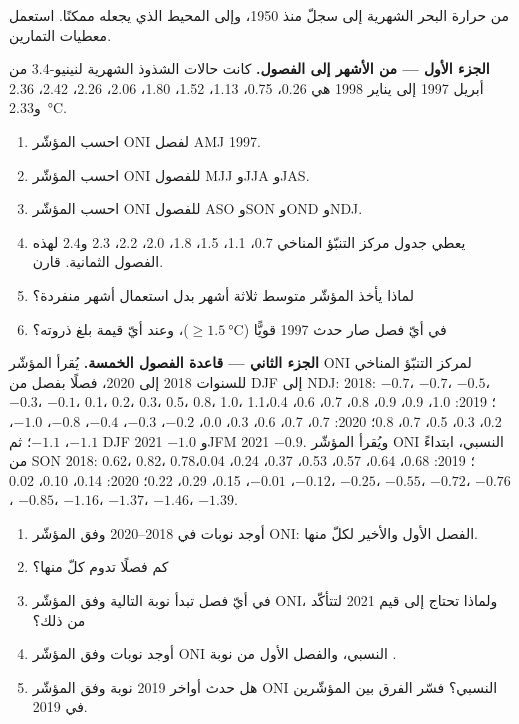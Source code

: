 \begin{problem}\label{pb:b2:climate-variability:1}
من حرارة البحر الشهرية إلى سجلّ  منذ 1950، وإلى المحيط الذي يجعله
ممكنًا. استعمل معطيات التمارين.

\medskip\noindent\textbf{الجزء الأول --- من الأشهر إلى الفصول.}
كانت حالات الشذوذ الشهرية لنينيو-3.4 من أبريل 1997 إلى يناير 1998 هي 0.26، 0.75، 1.13، 1.52، 1.80،
2.06، 2.26، 2.42، 2.36 و\qty{2.33}{\celsius}.
\begin{enumerate}
  \item احسب المؤشّر ONI لفصل AMJ 1997.
  \item احسب المؤشّر ONI للفصول MJJ وJJA وJAS.
  \item احسب المؤشّر ONI للفصول ASO وSON وOND وNDJ.
  \item يعطي جدول مركز التنبّؤ المناخي 0.7، 1.1، 1.5، 1.8، 2.0، 2.2، 2.3
        و2.4 لهذه الفصول الثمانية. قارن.
  \item لماذا يأخذ المؤشّر متوسط ثلاثة أشهر بدل استعمال أشهر منفردة؟
  \item في أيّ فصل صار حدث 1997 قويًّا ($\geq \qty{1.5}{\celsius}$)، وعند
        أيّ قيمة بلغ ذروته؟
\end{enumerate}

\medskip\noindent\textbf{الجزء الثاني --- قاعدة الفصول الخمسة.}
يُقرأ المؤشّر ONI لمركز التنبّؤ المناخي للسنوات 2018 إلى 2020، فصلًا بفصل من DJF إلى
NDJ: 2018: $-0.7$، $-0.7$، $-0.5$، $-0.3$، $-0.1$، 0.1، 0.2، 0.3، 0.5، 0.8، 1.0، 1.1؛ 2019: 1.0،
0.9، 0.9، 0.8، 0.7، 0.6، 0.4، 0.2، 0.3، 0.5، 0.7، 0.8؛ 2020: 0.7، 0.7، 0.6، 0.3، 0.0، $-0.2$،
$-0.3$، $-0.4$، $-0.8$، $-1.0$، $-1.1$، $-1.1$؛ ثم DJF 2021 $-1.0$ وJFM 2021 $-0.9$.
ويُقرأ المؤشّر ONI النسبي، ابتداءً من SON 2018: 0.62، 0.82، 0.78؛ 2019: 0.68، 0.64، 0.57، 0.53، 0.37، 0.24،
0.04، $-0.12$، $-0.01$، 0.15، 0.29، 0.22؛ 2020: 0.14، 0.10، 0.02، $-0.25$، $-0.55$، $-0.72$،
$-0.76$، $-0.85$، $-1.16$، $-1.37$، $-1.46$، $-1.39$.
\begin{enumerate}[resume]
  \item أوجد نوبات  في 2018--2020 وفق المؤشّر ONI: الفصل الأول والأخير لكلّ منها.
  \item كم فصلًا تدوم كلّ منها؟
  \item في أيّ فصل تبدأ نوبة  التالية وفق المؤشّر ONI، ولماذا تحتاج إلى
        قيم 2021 لتتأكّد من ذلك؟
  \item أوجد نوبات  وفق المؤشّر ONI النسبي، والفصل الأول من نوبة .
  \item هل حدث أواخر 2019 نوبة  وفق المؤشّر ONI النسبي؟ فسّر الفرق
        بين المؤشّرين في 2019.
\end{enumerate}


\end{problem}
